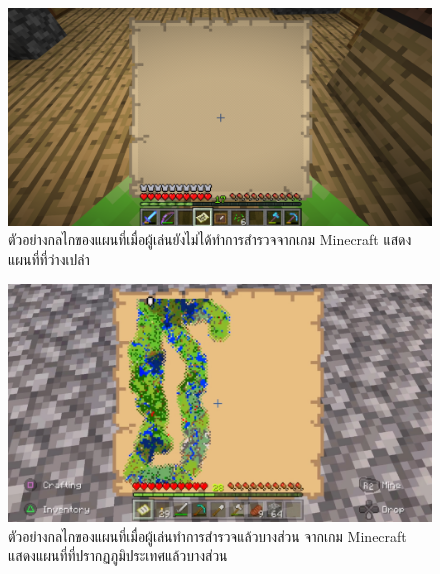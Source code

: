 \begin{figure}[h]
  \begin{center}
  \includegraphics[width=\textwidth]{./img/minecraftmap-blank.png}
  \end{center}
  \caption[ตัวอย่างกลไกของแผนที่เมื่อผู้เล่นยังไม่ได้ทำการสำรวจจากเกม Minecraft]{ตัวอย่างกลไกของแผนที่เมื่อผู้เล่นยังไม่ได้ทำการสำรวจจากเกม Minecraft แสดงแผนที่ที่ว่างเปล่า}
  \label{fig:minecrafmap-blank}
\end{figure}


\begin{figure}[h]
  \begin{center}
  \includegraphics[width=\textwidth]{./img/minecraftmap-partial.png}
  \end{center}
  \caption[ตัวอย่างกลไกของแผนที่เมื่อผู้เล่นทำการสำรวจแล้วบางส่วน จากเกม Minecraft]{ตัวอย่างกลไกของแผนที่เมื่อผู้เล่นทำการสำรวจแล้วบางส่วน จากเกม Minecraft แสดงแผนที่ที่ปรากฏภูมิประเทศแล้วบางส่วน}
  \label{fig:minecrafmap-partial}
\end{figure}

